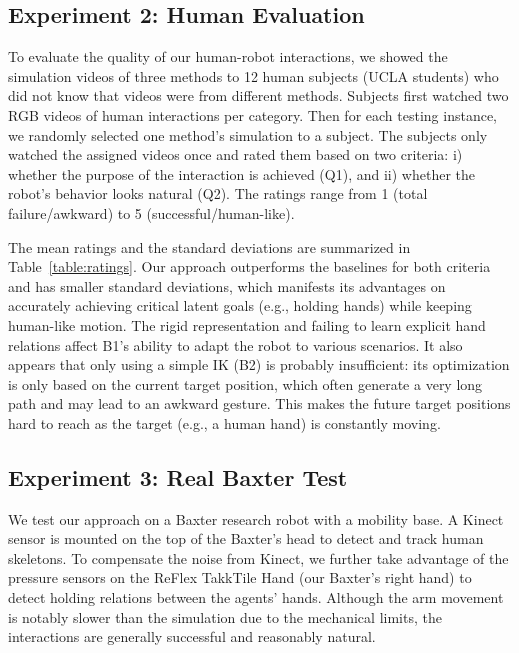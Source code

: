 \documentclass[letterpaper, 10 pt, conference]{ieeeconf}  %
\begin{document}
\subsection{Experiment 2: Human Evaluation}

To evaluate the quality of our human-robot interactions, we showed the simulation videos of three methods to 12 human subjects (UCLA students) who did not know that videos were from different methods. Subjects first watched two RGB videos of human interactions per category. Then for each testing instance, we randomly selected one method's simulation to a subject. The subjects only watched the assigned videos once and rated them based on two criteria: i) whether the purpose of the interaction is achieved (Q1), and ii) whether the robot's behavior looks natural (Q2). The ratings range from 1 (total failure/awkward) to 5 (successful/human-like).

The mean ratings and the standard deviations are summarized in Table~\ref{table:ratings}. Our approach outperforms the baselines for both criteria and has smaller standard deviations, which manifests its advantages on accurately achieving critical latent goals (e.g., holding hands) while keeping human-like motion. The rigid representation and failing to learn explicit hand relations affect B1's ability to adapt the robot to various scenarios. It also appears that only using a simple IK (B2) is probably insufficient: its optimization is only based on the current target position, which often generate a very long path and may lead to an awkward gesture. This makes the future target positions hard to reach as the target (e.g., a human hand) is constantly moving. %

\subsection{Experiment 3: Real Baxter Test}

We test our approach on a Baxter research robot with a mobility base. A Kinect sensor is mounted on the top of the Baxter's head to detect and track human skeletons. To compensate the noise from Kinect, we further take advantage of the pressure sensors on the ReFlex TakkTile Hand (our Baxter's right hand) to detect holding relations between the agents' hands. Although the arm movement is notably slower than the simulation due to the mechanical limits, the interactions are generally successful and reasonably natural. %
\end{document}
